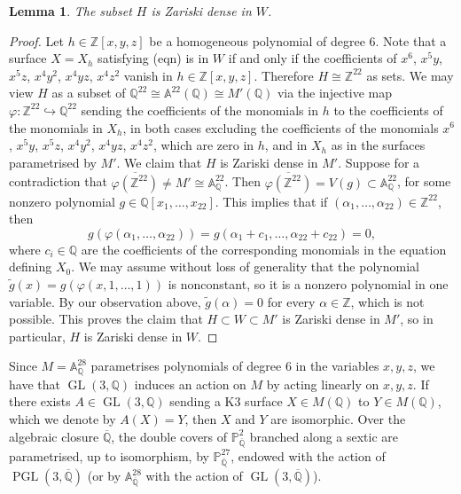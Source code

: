 \documentclass[11pt]{amsart}
\newcommand{\QQ}{\mathbb{Q}}
\newcommand{\ZZ}{\mathbb{Z}}
\newcommand{\PP}{\mathbb{P}}
\theoremstyle{plain}
\newtheorem{lemma}{Lemma}[section]
\theoremstyle{remark}
\begin{document}
\begin{lemma} \label{Hdense}
    The subset $H$ is Zariski dense in $W$.
\end{lemma}
\begin{proof}
 Let $h\in \ZZ[x,y,z]$ be a homogeneous polynomial of degree 6. Note that a surface $X=X_h$ satisfying (eqn) is in $W$ if and only if the coefficients of $x^6$, $x^5y$, $x^5z$, $x^4y^2$, $x^4yz$, $x^4z^2$ vanish in $h\in \ZZ[x,y,z]$. Therefore $H\cong \ZZ^{22}$ as sets. We may view $H$ as a subset of $ \QQ^{22}\cong \mathbb{A}^{22}(\QQ)\cong M'(\QQ)$ 
via the injective map $\varphi: \ZZ^{22}\hookrightarrow\QQ^{22}$
sending the coefficients of the monomials in $h$ to the coefficients of the monomials in $X_h$, in both cases excluding the coefficients of the monomials $x^6$, $x^5y$, $x^5z$, $x^4y^2$, $x^4yz$, $x^4z^2$, which are zero in $h$, and in $X_h$ as in the surfaces parametrised by $M'$. We claim that $H$ is Zariski dense in $M'$. Suppose for a contradiction that $\overline{\varphi(\ZZ^{22})}\neq M'\cong \mathbb{A}_{\QQ}^{22}$. Then $\overline{\varphi(\ZZ^{22})}=V(g)\subset \mathbb{A}_\QQ^{22}$, for some nonzero polynomial $g\in \QQ[x_1,\dots,x_{22}]$. This implies that if $(\alpha_1, \dots, \alpha_{22})\in \ZZ^{22}$, then \[g(\varphi(\alpha_1,\dots,\alpha_{22}))=g(\alpha_1+c_1,\dots,\alpha_{22}+c_{22})=0,\] where $c_i\in \QQ$ are the coefficients of the corresponding monomials in the equation defining $X_0$. 
We may assume without loss of generality that the polynomial 
\(
\widetilde{g}(x)= g(\varphi(x,1,\dots,1))
\)
is nonconstant, so it is a nonzero polynomial in one variable. By our observation above, $\widetilde{g}(\alpha)=0$ for every $\alpha \in \ZZ$, which is not possible.
This proves the claim that $H\subset W\subset M'$ is Zariski dense in $M'$, so in particular, $H$ is Zariski dense in $W$.
\end{proof}

Since $M=\mathbb{A}_\QQ^{28}$ parametrises polynomials of degree 6 in the variables $x,y,z$, we have that $\operatorname{GL}(3, \QQ)$ induces an action on $M$ by acting linearly on $x,y,z$. If there exists $A\in \operatorname{GL}(3, \QQ)$ sending a K3 surface $X\in M(\QQ)$ to $Y\in M(\QQ)$, which we denote by $A(X)=Y$, then $X$ and $Y$ are isomorphic. Over the algebraic closure $\overline{\QQ}$, the double covers of $\PP^2_{\overline{\QQ}}$ branched along a sextic are parametrised, up to isomorphism, by $\PP^{27}_{\overline{\QQ}}$, endowed with the action
 of $\operatorname{PGL}(3, \overline{\QQ})$ (or by $\mathbb{A}^{28}_{\overline{\QQ}}$ with the action of $\operatorname{GL}(3, \overline{\QQ})$).
\end{document}
